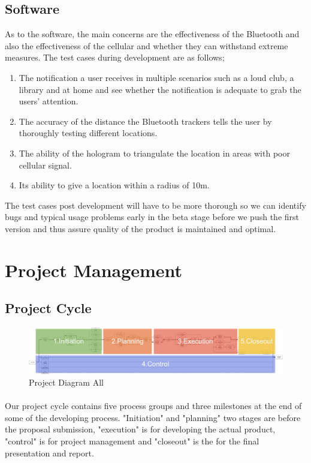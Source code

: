 \documentclass[12pt,a4paper]{article}
\begin{document}
      \subsection{Software}
      As to the software, the main concerns are the effectiveness of the Bluetooth and also the effectiveness of the cellular and whether they can withstand extreme measures. The test cases during development are as follows;
      \begin{enumerate}
        \item The notification a user receives in multiple scenarios such as a loud club, a library and at home and see whether the notification is adequate to grab the users’ attention.
        \item The accuracy of the distance the Bluetooth trackers tells the user by thoroughly testing different locations.
        \item The ability of the hologram to triangulate the location in areas with poor cellular signal.
        \item Its ability to give a location within a radius of 10m.
      \end{enumerate}
      The test cases post development will have to be more thorough so we can identify bugs and typical usage problems early in the beta stage before we push the first version and thus assure quality of the product is maintained and optimal.
          
    \section{Project Management}
      \subsection{Project Cycle}
      \begin{figure}[H]
        \centering
        \includegraphics[width=1\textwidth]{assets/9-project-diagram-all.jpg}
        \caption{Project Diagram All}
        \label{fig:Project Diagram All}
      \end{figure}
      \paragraph{}
        Our project cycle contains five process groups\cite{pmp} and three milestones at the end of some of the developing process. "Initiation" and "planning" two stages are before the proposal submission, "execution" is for developing the actual product, "control" is for project management and "closeout" is the for the final presentation and report.
      
\end{document}
